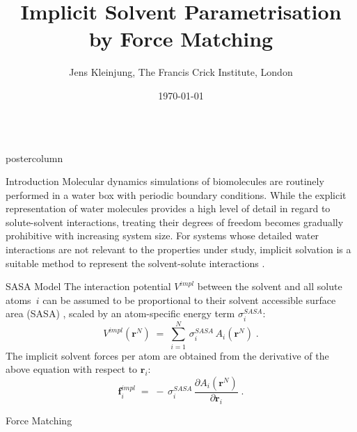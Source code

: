 \documentclass{beamer}
\title{\huge Implicit Solvent Parametrisation \\ by Force Matching}
\author{Jens Kleinjung, The Francis Crick Institute, London}
\institute[]{Franca Fraternali, King's College London}
\date{\today}
\newcommand{\sig}{$\sigma_i^{SASA}$}
\newlength{\columnheight}
\begin{document}
\begin{frame}
\begin{columns}
\begin{column}{.45\textwidth}
\begin{beamercolorbox}[center]{postercolumn}
\begin{minipage}{.98\textwidth}  %
\parbox[t][\columnheight]{\textwidth}{ %
\begin{myblock}{Introduction}
Molecular dynamics simulations of biomolecules are routinely performed in
a water box with periodic boundary conditions. While the explicit representation
of water molecules provides a high level of detail in regard to solute-solvent
interactions, treating their degrees of freedom becomes gradually prohibitive
with increasing system size. For systems whose detailed water interactions are
not relevant to the properties under study, implicit solvation is a suitable
method to represent the solvent-solute interactions
\cite{Allison:2011p4547,Kleinjung_2014}.
\end{myblock}\vfill
\begin{myblock}{SASA Model}
The interaction potential $V^{impl}$ between the solvent and all solute
atoms~$i$ can be assumed to be proportional to their solvent accessible
surface area (SASA) \cite{Hasel:1988p116},
scaled by an atom-specific energy term \sig:
\begin{equation}
\label{eq:sasapot}
V^{impl}(\mathbf{r}^N) \; = \; \sum_{i=1}^{N} \, \sigma_i^{SASA} \, A_i(\mathbf{r}^N) \; .
\end{equation}
The implicit solvent forces per atom are obtained from the derivative of the above
equation with respect to $\mathbf{r}_i$:
\begin{equation}
\label{eq:Fimpl}
\mathbf{f}_i^{impl} \; = \; - \, \sigma_i^{SASA} \, \frac{\partial A_i(\mathbf{r}^N)}{\partial \mathbf{r}_i} \; .
\end{equation}
\end{myblock}\vfill
\begin{myblock}{Force Matching}
\begin{figure}
\begin{minipage}{0.45\textwidth}

\end{minipage}
\end{figure}
\end{myblock}}
\end{minipage}
\end{beamercolorbox}
\end{column}
\end{columns}
\end{frame}
\end{document}
